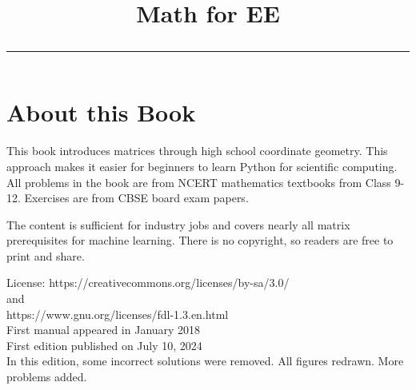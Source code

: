 \documentclass[journal]{IEEEtran}
\begin{document}

\onecolumn


\title{
	\begin{center}
	Math for EE
	\\
\rule{0.4\columnwidth}{0.4pt}
\end{center}
}
\section*{About this Book}

This book introduces matrices through high school coordinate geometry. This approach makes it easier for beginners to learn Python for scientific computing. All problems in the book are from NCERT mathematics textbooks from Class 9-12.  Exercises are from CBSE board exam papers.   

The content is sufficient for industry jobs and covers nearly all matrix prerequisites for machine learning.
There is no copyright, so readers are free to print and share.  

License: https://creativecommons.org/licenses/by-sa/3.0/
\\
and
\\
https://www.gnu.org/licenses/fdl-1.3.en.html
\\
First manual appeared in January 2018
\\
First edition published on July 10, 2024
\\
In this edition, some incorrect solutions were removed.  All figures redrawn. More problems added.
\end{document}
